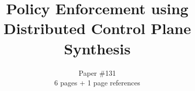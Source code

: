 \documentclass{hotnets16}
\begin{document}
 {}
\date{}


\title{Policy Enforcement using \\ Distributed Control Plane Synthesis}

\author{Paper \#131\\6 pages + 1 page references}

\maketitle















 
\begin{small}

\end{small}
\label{last-page}
\end{document}
